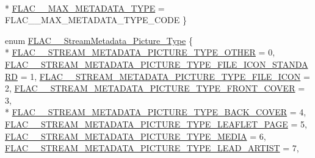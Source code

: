 \begin{DoxyCompactItemize}
\\*
\hyperlink{group__flac__format_ggac71714ba8ddbbd66d26bb78a427fac01a1a2f283a3dd9e7b46181d7a114ec5805}{F\+L\+A\+C\+\_\+\+\_\+\+M\+A\+X\+\_\+\+M\+E\+T\+A\+D\+A\+T\+A\+\_\+\+T\+Y\+PE} = F\+L\+A\+C\+\_\+\+\_\+\+M\+A\+X\+\_\+\+M\+E\+T\+A\+D\+A\+T\+A\+\_\+\+T\+Y\+P\+E\+\_\+\+C\+O\+DE
 \}
\item 
enum \hyperlink{group__flac__format_gaf6d3e836cee023e0b8d897f1fdc9825d}{F\+L\+A\+C\+\_\+\+\_\+\+Stream\+Metadata\+\_\+\+Picture\+\_\+\+Type} \{ \\*
\hyperlink{group__flac__format_ggaf6d3e836cee023e0b8d897f1fdc9825dadd6d6af32499b1973e48c9e8f13357ce}{F\+L\+A\+C\+\_\+\+\_\+\+S\+T\+R\+E\+A\+M\+\_\+\+M\+E\+T\+A\+D\+A\+T\+A\+\_\+\+P\+I\+C\+T\+U\+R\+E\+\_\+\+T\+Y\+P\+E\+\_\+\+O\+T\+H\+ER} = 0, 
\hyperlink{group__flac__format_ggaf6d3e836cee023e0b8d897f1fdc9825da5eca52e5cfcb718f33f5fce9b1021a49}{F\+L\+A\+C\+\_\+\+\_\+\+S\+T\+R\+E\+A\+M\+\_\+\+M\+E\+T\+A\+D\+A\+T\+A\+\_\+\+P\+I\+C\+T\+U\+R\+E\+\_\+\+T\+Y\+P\+E\+\_\+\+F\+I\+L\+E\+\_\+\+I\+C\+O\+N\+\_\+\+S\+T\+A\+N\+D\+A\+RD} = 1, 
\hyperlink{group__flac__format_ggaf6d3e836cee023e0b8d897f1fdc9825daaf44b9d5fb75dde6941463e5029aa351}{F\+L\+A\+C\+\_\+\+\_\+\+S\+T\+R\+E\+A\+M\+\_\+\+M\+E\+T\+A\+D\+A\+T\+A\+\_\+\+P\+I\+C\+T\+U\+R\+E\+\_\+\+T\+Y\+P\+E\+\_\+\+F\+I\+L\+E\+\_\+\+I\+C\+ON} = 2, 
\hyperlink{group__flac__format_ggaf6d3e836cee023e0b8d897f1fdc9825da3e20b405fd4e835ff3a4465b8bcb7c36}{F\+L\+A\+C\+\_\+\+\_\+\+S\+T\+R\+E\+A\+M\+\_\+\+M\+E\+T\+A\+D\+A\+T\+A\+\_\+\+P\+I\+C\+T\+U\+R\+E\+\_\+\+T\+Y\+P\+E\+\_\+\+F\+R\+O\+N\+T\+\_\+\+C\+O\+V\+ER} = 3, 
\\*
\hyperlink{group__flac__format_ggaf6d3e836cee023e0b8d897f1fdc9825da9ae132f2ee7d3baf35f94a9dc9640f62}{F\+L\+A\+C\+\_\+\+\_\+\+S\+T\+R\+E\+A\+M\+\_\+\+M\+E\+T\+A\+D\+A\+T\+A\+\_\+\+P\+I\+C\+T\+U\+R\+E\+\_\+\+T\+Y\+P\+E\+\_\+\+B\+A\+C\+K\+\_\+\+C\+O\+V\+ER} = 4, 
\hyperlink{group__flac__format_ggaf6d3e836cee023e0b8d897f1fdc9825dad3cb471b7925ae5034d9fd9ecfafb87a}{F\+L\+A\+C\+\_\+\+\_\+\+S\+T\+R\+E\+A\+M\+\_\+\+M\+E\+T\+A\+D\+A\+T\+A\+\_\+\+P\+I\+C\+T\+U\+R\+E\+\_\+\+T\+Y\+P\+E\+\_\+\+L\+E\+A\+F\+L\+E\+T\+\_\+\+P\+A\+GE} = 5, 
\hyperlink{group__flac__format_ggaf6d3e836cee023e0b8d897f1fdc9825dac994edc4166107ab5790e49f0b57ffd9}{F\+L\+A\+C\+\_\+\+\_\+\+S\+T\+R\+E\+A\+M\+\_\+\+M\+E\+T\+A\+D\+A\+T\+A\+\_\+\+P\+I\+C\+T\+U\+R\+E\+\_\+\+T\+Y\+P\+E\+\_\+\+M\+E\+D\+IA} = 6, 
\hyperlink{group__flac__format_ggaf6d3e836cee023e0b8d897f1fdc9825da1282e252e20553c39907074052960f42}{F\+L\+A\+C\+\_\+\+\_\+\+S\+T\+R\+E\+A\+M\+\_\+\+M\+E\+T\+A\+D\+A\+T\+A\+\_\+\+P\+I\+C\+T\+U\+R\+E\+\_\+\+T\+Y\+P\+E\+\_\+\+L\+E\+A\+D\+\_\+\+A\+R\+T\+I\+ST} = 7, 

\end{DoxyCompactItemize}
